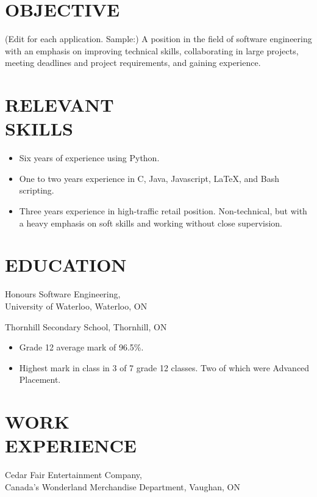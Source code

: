 \documentclass[11pt, margin]{res}
\begin{document}
\begin{resume}
 
\section{OBJECTIVE} (Edit for each application. Sample:) A position in the field of software engineering with an emphasis on improving technical skills, collaborating in large projects, meeting deadlines and project requirements, and gaining experience.

\section{RELEVANT \\ SKILLS}   \begin{itemize}[leftmargin=*, itemsep=-2pt]
                        \item Six years of experience using Python.
                        \item One to two years experience in C, Java, Javascript, LaTeX, and Bash scripting.
                        \item Three years experience in high-traffic retail position. Non-technical, but with a heavy emphasis on soft skills and working without close supervision.
                    \end{itemize}

\section{EDUCATION} 
                    Honours Software Engineering, \\
                    University of Waterloo, Waterloo, ON

                    Thornhill Secondary School, Thornhill, ON
                    \begin{itemize}[itemsep=-2pt]
                        \item Grade 12 average mark of 96.5\%.
                        \item Highest mark in class in 3 of 7 grade 12 classes. Two of which were Advanced Placement.
                    \end{itemize}

\section{WORK \\ EXPERIENCE} 
                Cedar Fair Entertainment Company, \\
                Canada's Wonderland Merchandise Department, Vaughan, ON 
                

\end{resume}
\end{document}
